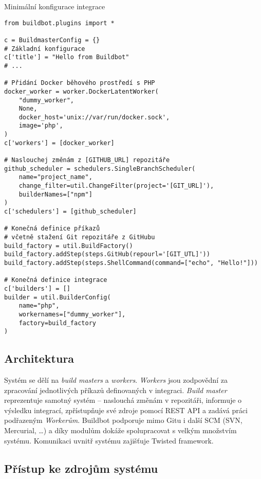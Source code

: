 \begin{listing}[ht]
\caption{\label{code:buildbot-minimal-config}Minimální konfigurace integrace}
\begin{verbatim}
from buildbot.plugins import *

c = BuildmasterConfig = {}
# Základní konfigurace
c['title'] = "Hello from Buildbot"
# ...

# Přidání Docker běhového prostředí s PHP
docker_worker = worker.DockerLatentWorker(
    "dummy_worker",
    None,
    docker_host='unix://var/run/docker.sock',
    image='php',
)
c['workers'] = [docker_worker]

# Naslouchej změnám z [GITHUB_URL] repozitáře
github_scheduler = schedulers.SingleBranchScheduler(
    name="project_name",
    change_filter=util.ChangeFilter(project='[GIT_URL]'),
    builderNames=["npm"]
)
c['schedulers'] = [github_scheduler]

# Konečná definice příkazů
# včetně stažení Git repozitáře z GitHubu
build_factory = util.BuildFactory()
build_factory.addStep(steps.GitHub(repourl='[GIT_UTL]'))
build_factory.addStep(steps.ShellCommand(command=["echo", "Hello!"]))

# Konečná definice integrace
c['builders'] = []
builder = util.BuilderConfig(
    name="php",
    workernames=["dummy_worker"],
    factory=build_factory
)

\end{verbatim}
\end{listing}

\subsection{Architektura}

Systém se dělí na \textit{build masters} a \textit{workers}.
\textit{Workers} jsou zodpovědní za zpracování jednotlivých příkazů definovaných v integraci.
\textit{Build master} reprezentuje samotný systém -- naslouchá změnám v repozitáři, informuje o výsledku integrací, zpřístupňuje své zdroje pomocí REST API a zadává práci podřazeným \textit{Workerům}.
Buildbot podporuje mimo Gitu i další SCM (SVN, Mercurial, \ldots) a díky modulům dokáže spolupracovat s velkým množstvím systému.
Komunikaci uvnitř systému zajišťuje Twisted framework.

\subsection{Přístup ke zdrojům systému}


